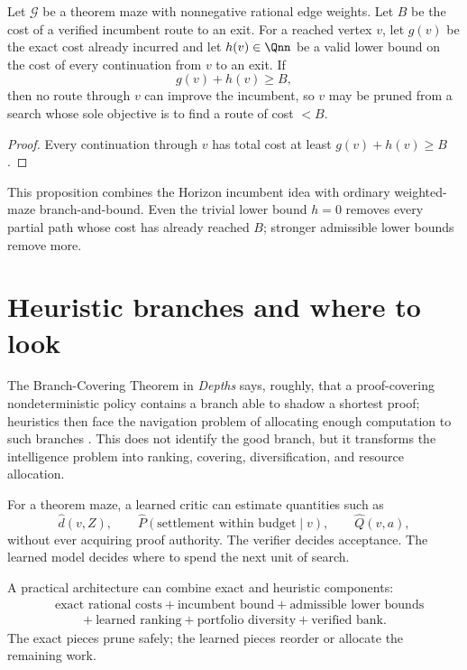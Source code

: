 \begin{proposition}
Let $\mathcal G$ be a theorem maze with nonnegative rational edge weights. Let $B$ be the cost of a verified incumbent route to an exit. For a reached vertex $v$, let $g(v)$ be the exact cost already incurred and let $h(v)\in\Qnn$ be a valid lower bound on the cost of every continuation from $v$ to an exit. If
\[
g(v)+h(v)\ge B,
\]
then no route through $v$ can improve the incumbent, so $v$ may be pruned from a search whose sole objective is to find a route of cost $<B$.
\end{proposition}
\begin{proof}
Every continuation through $v$ has total cost at least $g(v)+h(v)\ge B$.
\end{proof}

This proposition combines the Horizon incumbent idea with ordinary weighted-maze branch-and-bound. Even the trivial lower bound $h=0$ removes every partial path whose cost has already reached $B$; stronger admissible lower bounds remove more.

\section{Heuristic branches and where to look}
The Branch-Covering Theorem in \emph{Depths} says, roughly, that a proof-covering nondeterministic policy contains a branch able to shadow a shortest proof; heuristics then face the navigation problem of allocating enough computation to such branches \cite{depths}. This does not identify the good branch, but it transforms the intelligence problem into ranking, covering, diversification, and resource allocation.

For a theorem maze, a learned critic can estimate quantities such as
\[
\widehat d(v,Z),\qquad
\widehat P(\text{settlement within budget}\mid v),\qquad
\widehat Q(v,a),
\]
without ever acquiring proof authority. The verifier decides acceptance. The learned model decides where to spend the next unit of search.

A practical architecture can combine exact and heuristic components:
\[
\begin{aligned}
&\text{exact rational costs}+\text{incumbent bound}+\text{admissible lower bounds}\\
&\qquad +\text{learned ranking}+\text{portfolio diversity}+\text{verified bank}.
\end{aligned}
\]
The exact pieces prune safely; the learned pieces reorder or allocate the remaining work.
